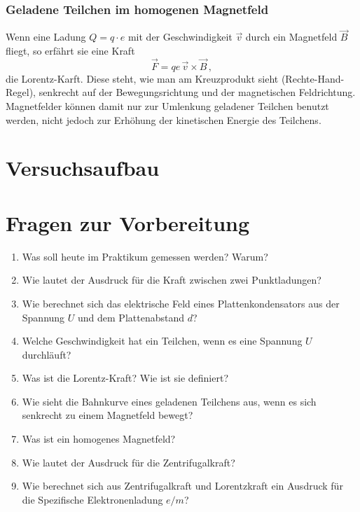 \subsubsection*{Geladene Teilchen im homogenen Magnetfeld}

Wenn eine Ladung $Q = q\cdot e$ mit der Geschwindigkeit $\vec{v}$ durch ein Magnetfeld $\vec{B}$ fliegt, so erfährt sie eine Kraft 
\begin{equation}
	\vec{F} = qe\, \vec{v}\times\vec{B}\, ,
\end{equation}
die Lorentz-Karft. Diese steht, wie man am Kreuzprodukt sieht (Rechte-Hand-Regel), senkrecht auf der Bewegungsrichtung und der magnetischen Feldrichtung. Magnetfelder können damit nur zur Umlenkung geladener Teilchen benutzt werden, nicht jedoch zur Erhöhung der kinetischen Energie des Teilchens.

\section{Versuchsaufbau}



\section{Fragen zur Vorbereitung}

\begin{enumerate}
	\item Was soll heute im Praktikum gemessen werden? Warum?
	\item Wie lautet der Ausdruck für die Kraft zwischen zwei Punktladungen?
	\item Wie berechnet sich das elektrische Feld eines Plattenkondensators aus der Spannung $U$ und dem Plattenabstand $d$?
	\item Welche Geschwindigkeit hat ein Teilchen, wenn es eine Spannung $U$ durchläuft?
	\item Was ist die Lorentz-Kraft? Wie ist sie definiert?
	\item Wie sieht die Bahnkurve eines geladenen Teilchens aus, wenn es sich senkrecht zu einem Magnetfeld bewegt?
	\item Was ist ein homogenes Magnetfeld?
	\item Wie lautet der Ausdruck für die Zentrifugalkraft?
	\item Wie berechnet sich aus Zentrifugalkraft und Lorentzkraft ein Ausdruck für die Spezifische Elektronenladung $e/m$?
\end{enumerate}

